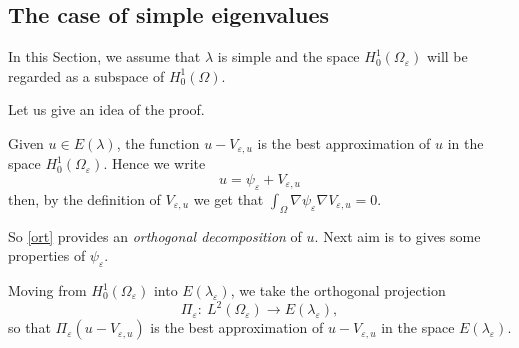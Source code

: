 \documentclass[11pt,reqno]{article}
\numberwithin{equation}{section}
\newcommand\e\varepsilon
\renewcommand\O\Omega
\begin{document}
\subsection{The case of simple eigenvalues}
    In this Section, we assume that $\lambda$ is simple and the space $H_0^1(\O_\e)$ will be regarded as a subspace of $H_0^1(\O)$. 	  

Let us give an idea of the proof. 

Given $u\in E(\lambda)$, the function $u-V_{\e,u}$ is the best approximation of $u$ in the space $H^1_0(\Omega_\e)$. Hence we write
\begin{equation}\label{ort}
u=\psi_\e+V_{\e,u}
\end{equation}
then, by the definition of $V_{\e,u}$ we get that $\int_\O\nabla\psi_\e\nabla V_{\e,u}=0$.

So \eqref{ort} provides an {\em orthogonal decomposition} of $u$. Next aim is to gives some properties of $\psi_\e$. 

Moving from $H^1_0(\Omega_\e)$ into $E(\lambda_\e)$, we take the orthogonal projection
	\[
	\Pi_\e: \ L^2(\Omega_\e) \to E(\lambda_\e),
	\]
so that $\Pi_\e(u-V_{\e,u})$ is the best approximation of $u-V_{\e,u}$ in the space $E(\lambda_\e)$.
\end{document}
